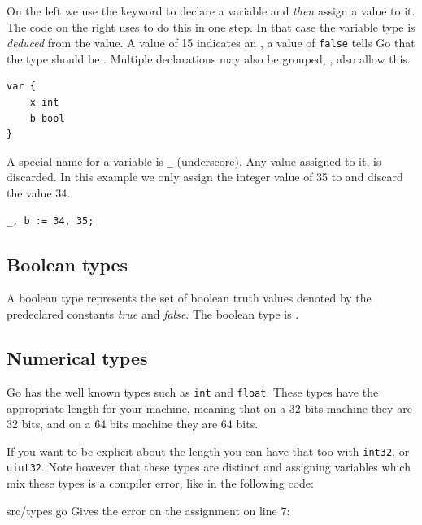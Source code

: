 On the left we use the
 keyword to declare a variable and \emph{then} assign a value to
it. The code on the right uses \mbox{\key{:=}{ }} to do this in one step. 
In that case the variable
type is \emph{deduced} from the value. A value of 15 indicates an ,
a value of \texttt{false} tells Go that the type should be . 
Multiple  declarations may also be grouped, ,
 also allow this.
\begin{lstlisting}
var {
    x int
    b bool
}
\end{lstlisting}

A special name for a variable is \texttt{\_} (underscore). Any value
assigned to it, is discarded. In this example we only assign the integer
value of 35 to  and discard the value 34.
\begin{lstlisting}
_, b := 34, 35;
\end{lstlisting}

\subsection{Boolean types}
A boolean type represents the set of boolean truth values denoted by the
predeclared constants \emph{true} and \emph{false}. The boolean type is .

\subsection{Numerical types}
Go has the well known types such as \lstinline{int} and
\lstinline{float}. These types have the appropriate length for your
machine, meaning that on a 32 bits machine they are 32 bits, and on
a 64 bits machine they are 64 bits.

If you want to be explicit about the length you can have
that too with \lstinline{int32}, or \lstinline{uint32}. Note however
that these types are distinct and assigning variables which mix
these types is a compiler error, like in the following code:


{src/types.go}
Gives the error on the assignment on line 7:

\noindent{}

